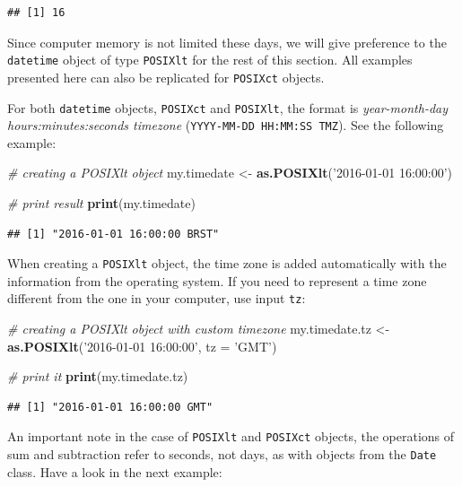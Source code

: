 \documentclass[11pt,]{book}
\newenvironment{Shaded}{\begin{snugshade}}{\end{snugshade}}
\newcommand{\KeywordTok}[1]{\textcolor[rgb]{0.27,0.27,0.27}{\textbf{#1}}}
\newcommand{\DataTypeTok}[1]{\textcolor[rgb]{0.27,0.27,0.27}{#1}}
\newcommand{\StringTok}[1]{\textcolor[rgb]{0.5,0.5,0.5}{#1}}
\newcommand{\CommentTok}[1]{\textcolor[rgb]{0.56,0.35,0.01}{\textit{#1}}}
\newcommand{\NormalTok}[1]{#1}
\begin{document}
\begin{verbatim}
## [1] 16
\end{verbatim}

Since computer memory is not limited these days, we will give preference
to the \texttt{datetime} object of type \texttt{POSIXlt} for the rest of
this section. All examples presented here can also be replicated for
\texttt{POSIXct} objects.

For both \texttt{datetime} objects, \texttt{POSIXct} and
\texttt{POSIXlt}, the format is \emph{year-month-day
hours:minutes:seconds timezone} (\texttt{YYYY-MM-DD\ HH:MM:SS\ TMZ}).
See the following example:

\begin{Shaded}
\begin{Highlighting}[]
\CommentTok{# creating a POSIXlt object}
\NormalTok{my.timedate <-}\StringTok{ }\KeywordTok{as.POSIXlt}\NormalTok{(}\StringTok{'2016-01-01 16:00:00'}\NormalTok{)}

\CommentTok{# print result}
\KeywordTok{print}\NormalTok{(my.timedate)}
\end{Highlighting}
\end{Shaded}

\begin{verbatim}
## [1] "2016-01-01 16:00:00 BRST"
\end{verbatim}

When creating a \texttt{POSIXlt} object, the time zone is added
automatically with the information from the operating system. If you
need to represent a time zone different from the one in your computer,
use input \texttt{tz}: 

\begin{Shaded}
\begin{Highlighting}[]
\CommentTok{# creating a POSIXlt object with custom timezone}
\NormalTok{my.timedate.tz <-}\StringTok{ }\KeywordTok{as.POSIXlt}\NormalTok{(}\StringTok{'2016-01-01 16:00:00'}\NormalTok{, }\DataTypeTok{tz =} \StringTok{'GMT'}\NormalTok{)}

\CommentTok{# print it}
\KeywordTok{print}\NormalTok{(my.timedate.tz)}
\end{Highlighting}
\end{Shaded}

\begin{verbatim}
## [1] "2016-01-01 16:00:00 GMT"
\end{verbatim}

An important note in the case of \texttt{POSIXlt} and \texttt{POSIXct}
objects, the operations of sum and subtraction refer to seconds, not
days, as with objects from the \texttt{Date} class. Have a look in the
next example:
\end{document}
